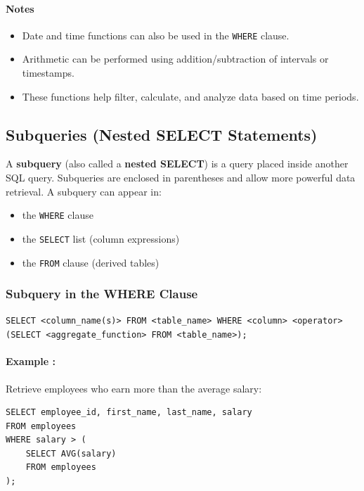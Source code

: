 \documentclass{article}
\begin{document}
\paragraph{Notes}
\begin{itemize}
    \item Date and time functions can also be used in the \texttt{WHERE} clause.
    \item Arithmetic can be performed using addition/subtraction of intervals or timestamps.
    \item These functions help filter, calculate, and analyze data based on time periods.
\end{itemize}


\subsection{Subqueries (Nested SELECT Statements)}

A \textbf{subquery} (also called a \textbf{nested SELECT}) is a query placed inside another SQL query.  
Subqueries are enclosed in parentheses and allow more powerful data retrieval.
A subquery can appear in:
\begin{itemize}
    \item the \texttt{WHERE} clause
    \item the \texttt{SELECT} list (column expressions)
    \item the \texttt{FROM} clause (derived tables)
\end{itemize}

\subsubsection{Subquery in the WHERE Clause}

\begin{FormulaBox}
\texttt{SELECT <column\_name(s)> FROM <table\_name> 
WHERE <column> <operator> (SELECT <aggregate\_function> FROM <table\_name>);}
\end{FormulaBox}

\paragraph{Example :}
Retrieve employees who earn more than the average salary:
\begin{verbatim}
SELECT employee_id, first_name, last_name, salary
FROM employees
WHERE salary > (
    SELECT AVG(salary)
    FROM employees
);
\end{verbatim}
\end{document}
